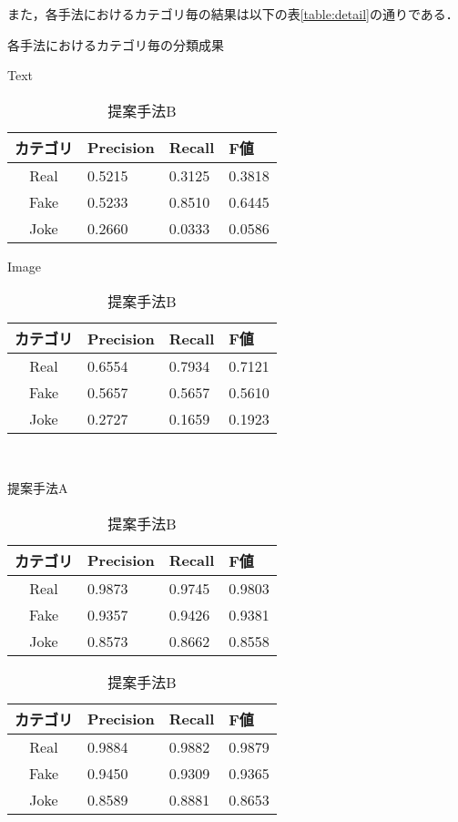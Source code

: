 また，各手法におけるカテゴリ毎の結果は以下の表\ref{table:detail}の通りである．
\begin{table}[ht]
    \caption{各手法におけるカテゴリ毎の分類成果}
    \label{table:detail}
    \begin{subtable}{.48\textwidth}
        \centering
        \label{table:text}
        \caption{Text}
        \begin{tabular}{clll}
            \hline
            カテゴリ & Precision & Recall & F値 \\
            \hline \hline
            Real & 0.5215 & 0.3125 & 0.3818 \\
            Fake & 0.5233 & 0.8510 & 0.6445 \\
            Joke & 0.2660 & 0.0333 & 0.0586 \\
            \hline
        \end{tabular}
    \end{subtable}
    \hfil
    \begin{subtable}{.48\textwidth}
        \centering
        \label{table:image}
        \caption{Image}
        \begin{tabular}{clll}
            \hline
            カテゴリ & Precision & Recall & F値 \\
            \hline \hline
            Real & 0.6554 & 0.7934 & 0.7121 \\
            Fake & 0.5657 & 0.5657 & 0.5610 \\
            Joke & 0.2727 & 0.1659 & 0.1923 \\
            \hline
        \end{tabular}
    \end{subtable}
    \\
    \begin{subtable}{.48\textwidth}
        \centering
        \label{table:proposedA}
        \caption{提案手法A}
        \begin{tabular}{clll}
            \hline
            カテゴリ & Precision & Recall & F値 \\
            \hline \hline
            Real & 0.9873 & 0.9745 & 0.9803 \\
            Fake & 0.9357 & 0.9426 & 0.9381 \\
            Joke & 0.8573 & 0.8662 & 0.8558 \\
            \hline
        \end{tabular}
    \end{subtable}
    \hfil
    \begin{subtable}{.48\textwidth}
        \centering
        \label{table:proposedB}
        \caption{提案手法B}
        \begin{tabular}{clll}
            \hline
            カテゴリ & Precision & Recall & F値 \\
            \hline \hline
            Real & 0.9884 & 0.9882 & 0.9879 \\
            Fake & 0.9450 & 0.9309 & 0.9365 \\
            Joke & 0.8589 & 0.8881 & 0.8653 \\
            \hline
        \end{tabular}
    \end{subtable}
\end{table}